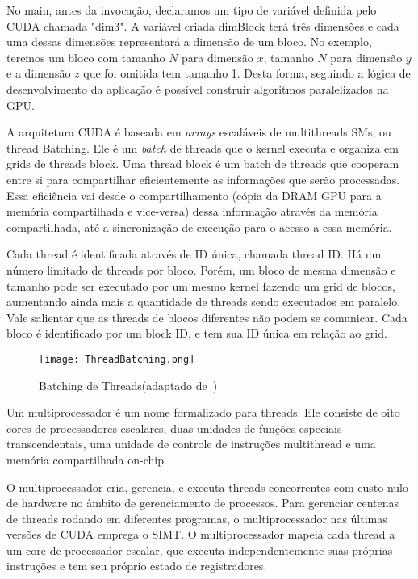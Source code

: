 No main, antes da invocação, declaramos um tipo de variável definida pelo CUDA chamada "dim3". A variável criada dimBlock terá três dimensões e cada uma dessas dimensões representará a dimensão de um bloco. No exemplo, teremos um bloco com tamanho $N$ para dimensão $x$, tamanho $N$ para dimensão $y$ e a dimensão $z$ que foi omitida tem tamanho 1. Desta forma, seguindo a lógica de desenvolvimento da aplicação é possível construir algoritmos paralelizados na GPU.


A arquitetura CUDA é baseada em \textit{arrays} escaláveis de multithreads SMs, ou thread Batching. Ele é um \textit{batch} de threads que o kernel executa e organiza em grids de threads block. Uma thread block é um batch de threads que cooperam entre si para compartilhar eficientemente as informações que serão processadas. Essa eficiência vai desde o compartilhamento (cópia da DRAM GPU para a memória compartilhada e vice-versa) dessa informação através da memória compartilhada, até a sincronização de execução para o acesso a essa memória.

Cada thread é identificada através de ID única, chamada thread ID. Há um número limitado de threads por bloco. Porém, um bloco de mesma dimensão e tamanho pode ser executado por um mesmo kernel fazendo um grid de blocos, aumentando ainda mais a quantidade de threads sendo executados em paralelo. Vale salientar que as threads de blocos diferentes não podem se comunicar.
Cada bloco é identificado por um block ID, e tem sua ID única em relação ao grid.

\begin{figure}[!htb]
	\begin{center}
	\centering
			\texttt{[image: ThreadBatching.png]}
	\caption{Batching de Threads(adaptado de~\citep{cuda})}
	\label{fig: ThreadBatching}
	\end{center}
\end{figure}

Um multiprocessador é um nome formalizado para threads. Ele consiste de oito cores de processadores escalares, duas unidades de funções especiais transcendentais, uma unidade de controle de instruções multithread e uma memória compartilhada on-chip.

O multiprocessador cria, gerencia, e executa threads concorrentes com custo nulo de hardware no âmbito de gerenciamento de processos. Para gerenciar centenas de threads rodando em diferentes programas, o multiprocessador nas últimas versões de CUDA emprega o SIMT. O multiprocessador mapeia cada thread a um core de processador escalar, que executa independentemente suas próprias instruções e tem seu próprio estado de registradores.

